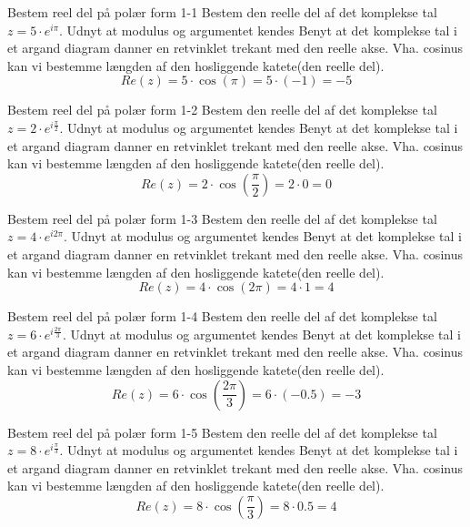 \documentclass{article}
\begin{document}
\tableofcontents
\newpage
\begin{exercise}{Bestem reel del på polær form 1-1}
Bestem den reelle del af det komplekse tal $z = 5 \cdot e^{i \pi}$.
\hint
Udnyt at modulus og argumentet kendes
\hint
Benyt at det komplekse tal i et argand diagram danner en retvinklet trekant med den reelle akse.
\hint
Vha. cosinus kan vi bestemme længden af den hosliggende katete(den reelle del).
\[Re(z) = 5 \cdot \cos(\pi) = 5 \cdot (-1) = - 5
\]
\end{exercise}
\newpage
\begin{exercise}{Bestem reel del på polær form 1-2}
Bestem den reelle del af det komplekse tal $z = 2 \cdot e^{i \frac{\pi}{2}}$.
\hint
Udnyt at modulus og argumentet kendes
\hint
Benyt at det komplekse tal i et argand diagram danner en retvinklet trekant med den reelle akse.
\hint
Vha. cosinus kan vi bestemme længden af den hosliggende katete(den reelle del).
\[Re(z) = 2 \cdot \cos\left(\frac{\pi}{2}\right) = 2 \cdot 0 = 0
\]
\end{exercise}
\newpage
\begin{exercise}{Bestem reel del på polær form 1-3}
Bestem den reelle del af det komplekse tal $z = 4 \cdot e^{i 2\pi}$.
\hint
Udnyt at modulus og argumentet kendes
\hint
Benyt at det komplekse tal i et argand diagram danner en retvinklet trekant med den reelle akse.
\hint
Vha. cosinus kan vi bestemme længden af den hosliggende katete(den reelle del).
\[Re(z) = 4 \cdot \cos(2\pi) = 4 \cdot 1 = 4
\]
\end{exercise}
\newpage
\begin{exercise}{Bestem reel del på polær form 1-4}
Bestem den reelle del af det komplekse tal $z = 6 \cdot e^{i \frac{2 \pi}{3}}$.
\hint
Udnyt at modulus og argumentet kendes
\hint
Benyt at det komplekse tal i et argand diagram danner en retvinklet trekant med den reelle akse.
\hint
Vha. cosinus kan vi bestemme længden af den hosliggende katete(den reelle del).
\[Re(z) = 6 \cdot \cos\left(\frac{2 \pi}{3} \right) = 6 \cdot (-0.5) = - 3
\]
\end{exercise}
\newpage
\begin{exercise}{Bestem reel del på polær form 1-5}
Bestem den reelle del af det komplekse tal $z = 8 \cdot e^{i \frac{\pi}{3}}$.
\hint
Udnyt at modulus og argumentet kendes
\hint
Benyt at det komplekse tal i et argand diagram danner en retvinklet trekant med den reelle akse.
\hint
Vha. cosinus kan vi bestemme længden af den hosliggende katete(den reelle del).
\[Re(z) = 8 \cdot \cos\left(\frac{\pi}{3} \right) = 8 \cdot 0.5 = 4
\]
\end{exercise}
\end{document}
